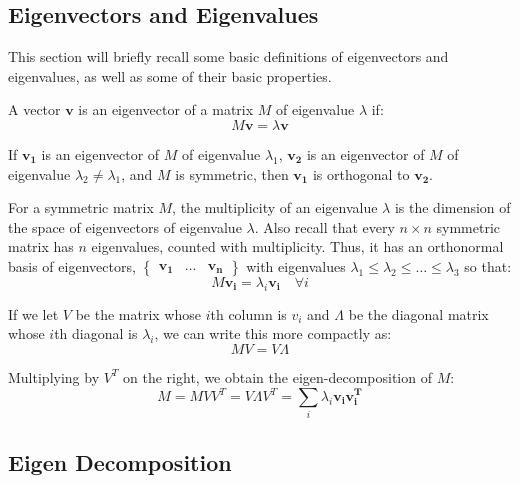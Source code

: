 \subsection{Eigenvectors and Eigenvalues}
\label{eigenvectors}
\label{eigenvalues}
This section will briefly recall some basic definitions of eigenvectors and
eigenvalues, as well as some of their basic properties.

A vector $\mathbf{v}$ is an eigenvector of a matrix $M$ of eigenvalue $\lambda$
if:
\begin{equation}
M\mathbf{v} = \lambda\textbf{v}
\end{equation}

If $\mathbf{v_1}$ is an eigenvector of $M$ of eigenvalue $\lambda_1$,
$\mathbf{v_2}$ is an eigenvector of $M$ of eigenvalue $\lambda_2\neq\lambda_1$,
and $M$ is symmetric, then $\mathbf{v_1}$ is orthogonal to $\mathbf{v_2}$.

For a symmetric matrix $M$, the multiplicity of an eigenvalue $\lambda$ is the
dimension of the space of eigenvectors of eigenvalue $\lambda$. Also recall that
every $n\times n$ symmetric matrix has $n$ eigenvalues, counted with
multiplicity. Thus, it has an orthonormal basis of eigenvectors,
$\begin{Bmatrix} \mathbf{v_1} & \ldots & \mathbf{v_n} \end{Bmatrix}$ with
eigenvalues $\lambda_1\leq\lambda_2\leq\ldots\leq\lambda_3$ so that:
\begin{equation}
M\mathbf{v_i} = \lambda_i \mathbf{v_i} \quad \forall i
\end{equation}

If we let $V$ be the matrix whose $i$th column is $v_i$ and $\Lambda$ be the
diagonal matrix whose $i$th diagonal is $\lambda_i$, we can write this more
compactly as:
\begin{equation}
MV = V\Lambda
\end{equation}

Multiplying by $V^T$ on the right, we obtain the eigen-decomposition of $M$:
\begin{equation}
M = MVV^T = V{\Lambda}V^T = \sum_i \lambda_i\mathbf{v_i}\mathbf{v_i^T}
\end{equation}

\subsection{Eigen Decomposition}
\label{eigenDecomposition}

